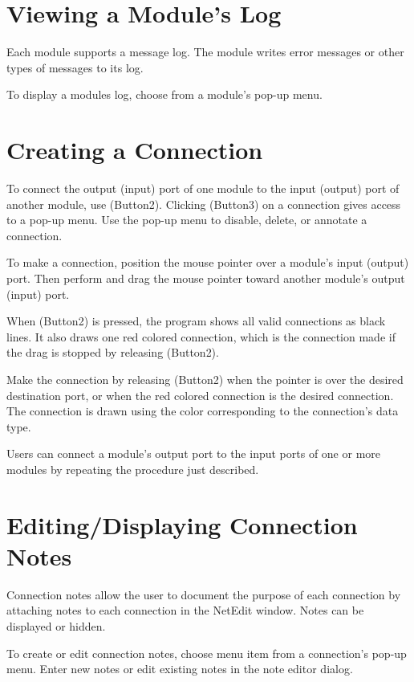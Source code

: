 \section{Viewing a Module's Log}
\label{sec:viewmodslog}

Each module supports a message log. The module writes error messages
or other types of messages to its log.

To display a modules log, choose  from a module's
pop-up menu.


\section{Creating a Connection}
\label{sec:connectmods}

To connect the output (input) port of one module to the input (output)
port of another module, use \keyboard(Button2). Clicking \keyboard(Button3) on a connection
gives access to a pop-up menu. Use the pop-up menu to disable, delete,
or annotate a connection.

To make a connection, position the mouse pointer over a module's input
(output) port.  Then perform  and drag the
mouse pointer toward another module's output (input) port.

When \keyboard(Button2) is pressed, the program shows all valid connections as black
lines.  It also draws one red colored connection, which is the
connection made if the drag is stopped by releasing \keyboard(Button2).

Make the connection by releasing \keyboard(Button2) when the pointer is over the
desired destination port, or when the red colored connection is the
desired connection.  The connection is drawn using the color
corresponding to the connection's data type.

Users can connect a module's output port to the input ports of one or more
modules by repeating the procedure just described.

\section{Editing/Displaying Connection Notes}
\label{sec:displaynotes}

Connection notes allow the user to document the purpose of
each connection by attaching notes to each connection in the NetEdit window.
Notes can be displayed or hidden.

To create or edit connection notes, choose menu item  from
a connection's pop-up menu. Enter new notes or edit existing notes in
the note editor dialog.

